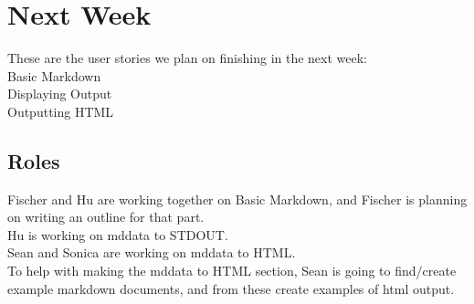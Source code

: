 \section{Next Week}

These are the user stories we plan on finishing in the next week:\\
Basic Markdown\\
Displaying Output\\
Outputting HTML\\

\subsection{Roles}
Fischer and Hu are working together on Basic Markdown, and Fischer is planning on writing an outline for that part.\\
Hu is working on mddata to STDOUT.\\
Sean and Sonica are working on mddata to HTML.\\
To help with making the mddata to HTML section, Sean is going to find/create example markdown documents, and from these create examples of html output.\\